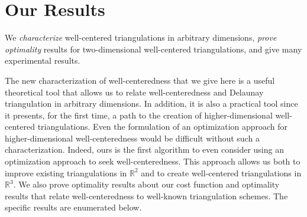 \documentclass[final]{siamltex}
\newcommand{\Real}{\ensuremath{\mathbb{R}}} \newcommand{\meshM}{\ensuremath{\mathcal{M}}} \newcommand{\meshV}{\ensuremath{\mathcal{V}}} \newcommand{\meshT}{\ensuremath{\mathcal{T}}} \newcommand{\interior}{\ensuremath{\mathrm{Int}}}
\begin{document}
\section{Our Results} We \emph{characterize} well-centered
triangulations in arbitrary dimensions,
\emph{prove optimality} results for two-dimensional
well-centered triangulations, and give many experimental results.

The new characterization of well-centeredness that we give here is a
useful theoretical tool that allows us to relate well-centeredness and
Delaunay triangulation in arbitrary dimensions. In addition, it is
also a practical tool since it presents, for the first time, a path to
the creation of higher-dimensional well-centered triangulations.  Even
the formulation of an optimization approach for higher-dimensional
well-centeredness would be difficult without such a characterization.
Indeed, ours is the first algorithm
to even consider using an optimization approach
to seek well-centeredness. This approach allows us
both to improve existing triangulations in $\Real^{2}$
and to create well-centered triangulations in $\Real^{3}$.
We also prove optimality results about our cost function
and optimality results that relate well-cen\-tered\-ness to well-known
triangulation schemes. The specific results are enumerated below.
\end{document}
